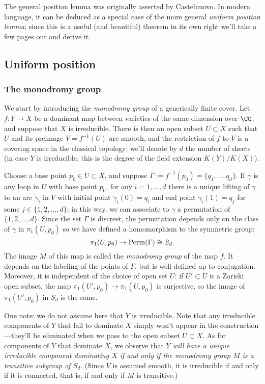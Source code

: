 The general position lemma was originally asserted by Castelnuovo. In modern language, it can be deduced as a special case of the more general \emph{uniform position lemma}; since this is a useful (and beautiful) theorem in its own right we'll take a few pages out and 
derive it. 

\subsection{Uniform position} 

\subsubsection{The monodromy group}

We start by introducing the \emph{monodromy group} of a generically finite cover. Let $f : Y \to X$ be a dominant map between varieties of the same dimension over $\CC$, and suppose that $X$ is irreducible. There is then an open subset $U \subset X$ such that $U$ and 
its preimage $V = f^{-1}(U)$ are smooth, and the restriction of $f$ to $V$ is a covering space in the classical topology; we'll denote by $d$ the number of sheets (in case $Y$ is irreducible, this is the degree of the field extension $K(Y)/K(X)$). 

Choose a base point $p_0 \in U \subset X$, and suppose $\Gamma := f^{-1}(p_0)  = \{q_1,\dots,q_d\}$. If $\gamma$ is any loop in $U$ with base point $p_0$, for any $i = 1, \dots, d$ there is a unique lifting of $\gamma$ to an arc $\tilde \gamma_i$ in $V$ with initial point $\tilde \gamma_i(0) = q_i$ and end point $\tilde \gamma_i(1) = q_j$ for some $j \in \{1,2,\dots,d\}$; in this way, we can associate to $\gamma$ a permutation of $\{1,2,\dots,d\}$. 
Since the set $\Gamma$ is discreet, the permutation depends only on the class of $\gamma$ in $\pi_1(U,p_0)$ so we have defined a homomorphism to the symmetric group:
$$
\pi_1(U,p_0)  \to {\rm Perm}(\Gamma) \cong S_d.
$$
The image $M$ of this map is called the \emph{monodromy group} of the map $f$. It depends on the labeling of the points of $\Gamma$, but is well-defined  up to conjugation. Moreover, it is independent of the choice of open set $U$: if $U' \subset U$ is a Zariski open subset, the map $\pi_1(U', p_0) \to \pi_1(U,p_0)$ is surjective,  so the image of $\pi_1(U', p_0)$ in $S_d$ is the same.

One note: we do not assume here that $Y$ is irreducible. Note that any irreducible components of $Y$ that fail to dominate $X$ simply won't appear in the construction---they'll be eliminated when we pass to the open subset $U \subset X$. As for components of $Y$ that dominate $X$, we observe that \emph{$Y$ will have a unique irreducible component dominating $X$ if and only if the monodromy group $M$ is a transitive subgroup of $S_d$}. (Since $V$ is assumed smooth, it is irreducible if and only if it is connected, that is, if and only if $M$ is transitive.)


